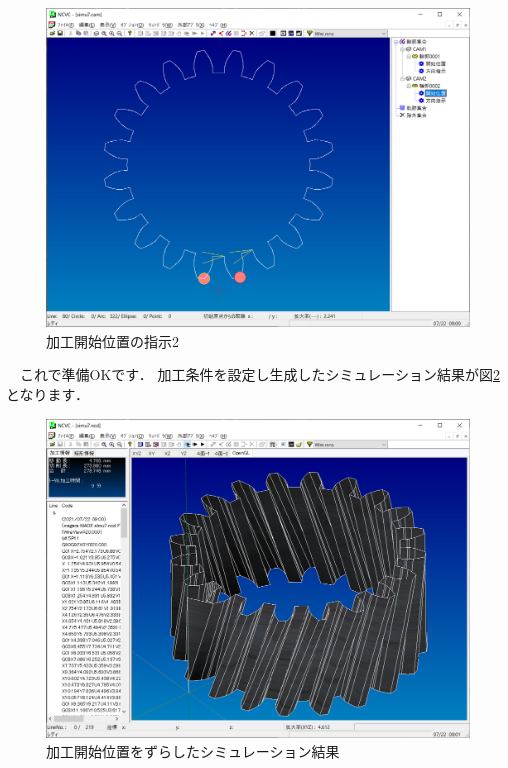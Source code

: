 \begin{figure}[H]
\centering
\includegraphics[scale=0.5]{No2/fig/start2.png}
\caption{加工開始位置の指示2}
\label{fig:start2.png}
\end{figure}

　これで準備OKです．
加工条件を設定し生成したシミュレーション結果が図\ref{fig:simu7.png} となります．

\begin{figure}[H]
\centering
\includegraphics[scale=0.5]{No2/fig/simu7.png}
\caption{加工開始位置をずらしたシミュレーション結果}
\label{fig:simu7.png}
\end{figure}

